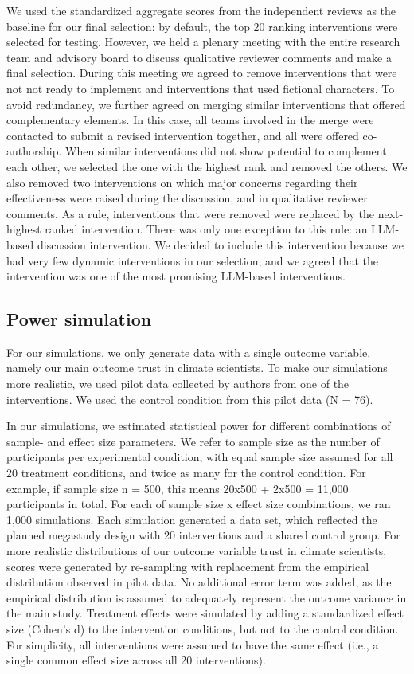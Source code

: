 \documentclass[
  letterpaper,
  DIV=11,
  numbers=noendperiod]{scrartcl}
\begin{document}
We used the standardized aggregate scores from the independent reviews
as the baseline for our final selection: by default, the top 20 ranking
interventions were selected for testing. However, we held a plenary
meeting with the entire research team and advisory board to discuss
qualitative reviewer comments and make a final selection. During this
meeting we agreed to remove interventions that were not not ready to
implement and interventions that used fictional characters. To avoid
redundancy, we further agreed on merging similar interventions that
offered complementary elements. In this case, all teams involved in the
merge were contacted to submit a revised intervention together, and all
were offered co-authorship. When similar interventions did not show
potential to complement each other, we selected the one with the highest
rank and removed the others. We also removed two interventions on which
major concerns regarding their effectiveness were raised during the
discussion, and in qualitative reviewer comments. As a rule,
interventions that were removed were replaced by the next-highest ranked
intervention. There was only one exception to this rule: an LLM-based
discussion intervention. We decided to include this intervention because
we had very few dynamic interventions in our selection, and we agreed
that the intervention was one of the most promising LLM-based
interventions.

\subsection{Power simulation}\label{sec-power}

For our simulations, we only generate data with a single outcome
variable, namely our main outcome trust in climate scientists. To make
our simulations more realistic, we used pilot data collected by authors
from one of the interventions. We used the control condition from this
pilot data (N = 76).

In our simulations, we estimated statistical power for different
combinations of sample- and effect size parameters. We refer to sample
size as the number of participants per experimental condition, with
equal sample size assumed for all 20 treatment conditions, and twice as
many for the control condition. For example, if sample size n = 500,
this means 20x500 + 2x500 = 11,000 participants in total. For each of
sample size x effect size combinations, we ran 1,000 simulations. Each
simulation generated a data set, which reflected the planned megastudy
design with 20 interventions and a shared control group. For more
realistic distributions of our outcome variable trust in climate
scientists, scores were generated by re-sampling with replacement from
the empirical distribution observed in pilot data. No additional error
term was added, as the empirical distribution is assumed to adequately
represent the outcome variance in the main study. Treatment effects were
simulated by adding a standardized effect size (Cohen's d) to the
intervention conditions, but not to the control condition. For
simplicity, all interventions were assumed to have the same effect
(i.e., a single common effect size across all 20 interventions).
\end{document}
